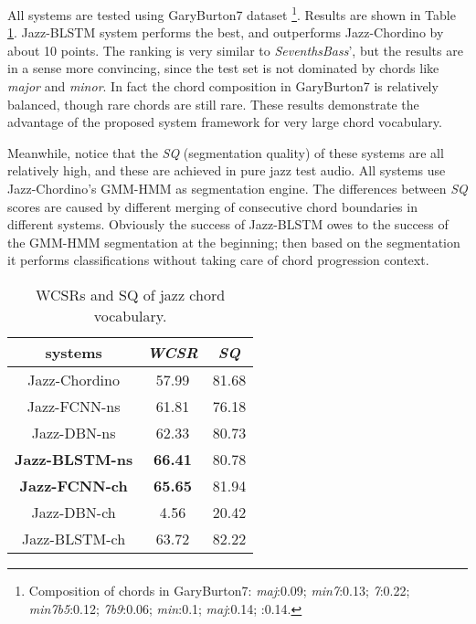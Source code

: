 All systems are tested using GaryBurton7 dataset \footnote{Composition of chords in GaryBurton7: \textit{maj}:0.09; \textit{min7}:0.13; \textit{7}:0.22; \textit{min7b5}:0.12; \textit{7b9}:0.06; \textit{min}:0.1; \textit{maj}:0.14; \textit{}:0.14.}. Results are shown in Table \ref{tab:5-jazz-wcsr}. Jazz-BLSTM system performs the best, and outperforms Jazz-Chordino by about 10 points. The ranking is very similar to \textit{SeventhsBass}', but the results are in a sense more convincing, since the test set is not dominated by chords like \textit{major} and \textit{minor}. In fact the chord composition in GaryBurton7 is relatively balanced, though rare chords are still rare. These results demonstrate the advantage of the proposed system framework for very large chord vocabulary.

Meanwhile, notice that the \textit{SQ} (segmentation quality) of these systems are all relatively high, and these are achieved in pure jazz test audio. All systems use Jazz-Chordino's GMM-HMM as segmentation engine. The differences between \textit{SQ} scores are caused by different merging of consecutive chord boundaries in different systems. Obviously the success of Jazz-BLSTM owes to the success of the GMM-HMM segmentation at the beginning; then based on the segmentation it performs classifications without taking care of chord progression context.

\begin{table}[t]
\centering
\footnotesize
\begin{tabular}{|c|c|c|} \hline
systems & \textit{WCSR} & \textit{SQ}\\ \hline
Jazz-Chordino & 57.99 & 81.68\\ \hline
Jazz-FCNN-ns & 61.81& 76.18\\ \hline
Jazz-DBN-ns & 62.33& 80.73\\ \hline
\textbf{Jazz-BLSTM-ns} & \textbf{66.41} & 80.78\\ \hline
\textbf{Jazz-FCNN-ch} & \textbf{65.65} & 81.94\\ \hline
Jazz-DBN-ch & 4.56& 20.42\\ \hline
Jazz-BLSTM-ch & 63.72 & 82.22\\ \hline
\end{tabular}
\caption{WCSRs and SQ of jazz chord vocabulary.}
\label{tab:5-jazz-wcsr}
\end{table}

